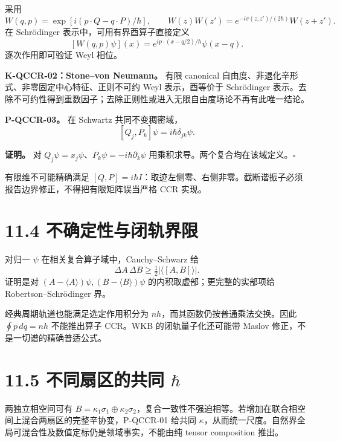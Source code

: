 \documentclass[
  11pt,
  oneside]{book}
\begin{document}
采用 \[
W(q,p)=\exp[i(p\cdot Q-q\cdot P)/\hbar],\qquad
W(z)W(z')=e^{-i\sigma(z,z')/(2\hbar)}W(z+z').
\] 在 Schrödinger 表示中，可用有界酉算子直接定义 \[
[W(q,p)\psi](x)=e^{ip\cdot(x-q/2)/\hbar}\psi(x-q).
\] 逐次作用即可验证 Weyl 相位。

\textbf{K-QCCR-02：Stone--von Neumann。} 有限 canonical
自由度、非退化辛形式、非零固定中心特征、正则不可约 Weyl 表示，酉等价于
Schrödinger
表示。去除不可约性得到重数因子；去除正则性或进入无限自由度场论不再有此唯一结论。

\protect\hypertarget{p-qccr-03}{}{}

\textbf{P-QCCR-03。} 在 Schwartz 共同不变稠密域， \[
[Q_j,P_k]\psi=i\hbar\delta_{jk}\psi.
\]

\textbf{证明。} 对
\(Q_j\psi=x_j\psi\)、\(P_k\psi=-i\hbar\partial_k\psi\)
用乘积求导。两个复合均在该域定义。\(\square\)

有限维不可能精确满足
\([Q,P]=i\hbar I\)：取迹左侧零、右侧非零。截断谐振子必须报告边界修正，不得把有限矩阵误当严格
CCR 实现。

\hypertarget{ux4e0dux786eux5b9aux6027ux4e0eux95edux8f68ux754cux9650}{%
\section{11.4
不确定性与闭轨界限}\label{ux4e0dux786eux5b9aux6027ux4e0eux95edux8f68ux754cux9650}}

对归一 \(\psi\) 在相关复合算子域中，Cauchy--Schwarz 给 \[
\Delta A\,\Delta B\ge\tfrac12|\langle[A,B]\rangle|.
\] 证明是对 \((A-\langle A\rangle)\psi,(B-\langle B\rangle)\psi\)
的内积取虚部；更完整的实部项给 Robertson--Schrödinger 界。

经典周期轨道也能满足选定作用积分为
\(nh\)，而其函数仍按普通乘法交换。因此 \(\oint p\,dq=nh\) 不能推出算子
CCR。WKB 的闭轨量子化还可能带 Maslov 修正，不是一切谱的精确普适公式。

\hypertarget{ux4e0dux540cux6247ux533aux7684ux5171ux540c-hbar}{%
\section{\texorpdfstring{11.5 不同扇区的共同
\(\hbar\)}{11.5 不同扇区的共同 \textbackslash hbar}}\label{ux4e0dux540cux6247ux533aux7684ux5171ux540c-hbar}}

两独立相空间可有
\(B=\kappa_1\sigma_1\oplus\kappa_2\sigma_2\)，复合一致性不强迫相等。若增加在联合相空间上混合两扇区的完整辛协变，P-QCCR-01
给共同
\(\kappa\)，从而统一尺度。自然界全局可混合性及数值定标仍是领域事实，不能由纯
tensor composition 推出。
\end{document}
